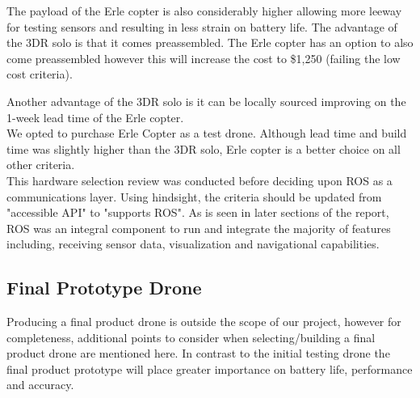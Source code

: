 \documentclass[capstone_report.tex]{subfiles}
\begin{document}
The payload of the Erle copter is also considerably higher allowing more leeway for testing sensors and resulting in less strain on battery life.  The advantage of the 3DR solo is that it comes preassembled.  The Erle copter has an option to also come preassembled however this will increase the cost to \$1,250 (failing the low cost criteria).

Another advantage of the 3DR solo is it can be locally sourced improving on the 1-week lead time of the Erle copter.\\

We opted to purchase Erle Copter as a test drone.  Although lead time and build time was slightly higher than the 3DR solo, Erle copter is a better choice on all other criteria.\\

This hardware selection review was conducted before deciding upon ROS as a communications layer.  Using hindsight, the criteria should be updated from "accessible API" to "supports ROS".  As is seen in later sections of the report, ROS was an integral component to run and integrate the majority of features including, receiving sensor data, visualization and navigational capabilities.

\subsection{Final Prototype Drone}
Producing a final product drone is outside the scope of our project, however for completeness, additional points to consider when selecting/building a final product drone are mentioned here.  In contrast to the initial testing drone the final product prototype will place greater importance on battery life, performance and accuracy.
\end{document}
